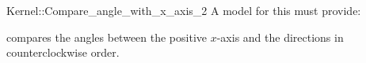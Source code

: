 \begin{ccRefFunctionObjectConcept}{Kernel::Compare_angle_with_x_axis_2}
A model for this must provide:


 {compares
  the angles between the positive $x$-axis and the directions in
  counterclockwise order.}

\ccIsModel{}

\end{ccRefFunctionObjectConcept}
